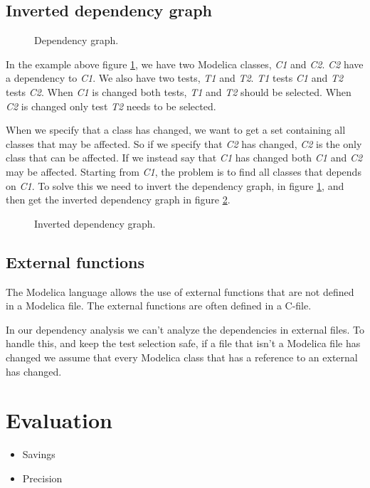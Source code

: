 \documentclass{cslthse-msc}
\begin{document}
\section{Inverted dependency graph}
\begin{figure}[H]
    \centering
    \caption{Dependency graph.}
    \label{fig:dependencyGraph}
\end{figure}
In the example above figure \ref{fig:dependencyGraph}, we have two Modelica classes, \textit{C1} and \textit{C2}. \textit{C2} have a dependency to \textit{C1}. We also have two tests, \textit{T1} and \textit{T2}. \textit{T1} tests \textit{C1} and \textit{T2} tests \textit{C2}. When \textit{C1} is changed both tests, \textit{T1} and \textit{T2} should be selected. When \textit{C2} is changed only test \textit{T2} needs to be selected.

When we specify that a class has changed, we want to get a set containing all classes that may be affected. So if we specify that \textit{C2} has changed, \textit{C2} is the only class that can be affected. If we instead say that \textit{C1} has changed both \textit{C1} and \textit{C2} may be affected. Starting from \textit{C1}, the problem is to find all classes that depends on \textit{C1}. To solve this we need to invert the dependency graph, in figure \ref{fig:dependencyGraph}, and then get the inverted dependency graph in figure \ref{fig:invertedGraph}. 
\begin{figure}[H]
    \centering
    \caption{Inverted dependency graph.}
    \label{fig:invertedGraph}
\end{figure}
\section{External functions}
The Modelica language allows the use of external functions that are not defined in a Modelica file. The external functions are often defined in a C-file.\cite{modelicamodelica}

In our dependency analysis we can't analyze the dependencies in external files. To handle this, and keep the test selection safe, if a file that isn't a Modelica file has changed we assume that every Modelica class that has a reference to an external has changed.
\chapter[Evaluation]{Evaluation}
\begin{itemize}
	\item Savings
	\item Precision
\end{itemize}
\end{document}
